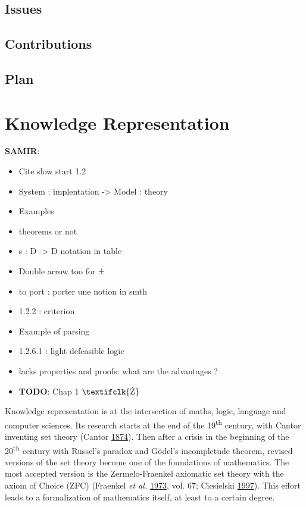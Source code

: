 \documentclass[11pt,a4paper,twoside,openright,titlepage,numbers=noenddot,headinclude,cleardoublepage=empty,openany]{scrreprt}
\theoremstyle{plain}
\theoremstyle{definition}
\theoremstyle{remark}
\providecommand{\tightlist}{%
  \setlength{\itemsep}{0pt}\setlength{\parskip}{0pt}}
\newcommand{\timeout}{\textifclk{\symbol{153}}}
\begin{document}
\hypertarget{issues}{%
\section{Issues}\label{issues}}

\hypertarget{contributions}{%
\section{Contributions}\label{contributions}}

\hypertarget{plan}{%
\section{Plan}\label{plan}}

\hypertarget{knowledge-representation}{%
\chapter{Knowledge Representation}\label{knowledge-representation}}

\textbf{SAMIR}:

\begin{itemize}
\tightlist
\item
  Cite slow start 1.2
\item
  System : implentation -\textgreater{} Model : theory
\item
  Examples
\item
  theorems or not
\item
  s : D -\textgreater{} D notation in table
\item
  Double arrow too for ±
\item
  to port : porter une notion in smth
\item
  1.2.2 : criterion
\item
  Example of parsing
\item
  1.2.6.1 : light defeasible logic
\item
  lacks properties and proofs: what are the advantages ?
\item
  \textbf{TODO}: Chap 1 \(\timeout\)
\end{itemize}

Knowledge representation is at the intersection of maths, logic,
language and computer sciences. Its research starts at the end of the
19\textsuperscript{th} century, with Cantor inventing set theory (Cantor
\protect\hyperlink{ref-cantor_property_1874}{1874}). Then after a crisis
in the beginning of the 20\textsuperscript{th} century with Russel's
paradox and Gödel's incompletude theorem, revised versions of the set
theory become one of the foundations of mathematics. The most accepted
version is the Zermelo-Fraenkel axiomatic set theory with the axiom of
Choice (ZFC) (Fraenkel \emph{et al.}
\protect\hyperlink{ref-fraenkel_foundations_1973}{1973}, vol. 67;
Ciesielski \protect\hyperlink{ref-ciesielski_set_1997}{1997}). This
effort leads to a formalization of mathematics itself, at least to a
certain degree.
\end{document}

